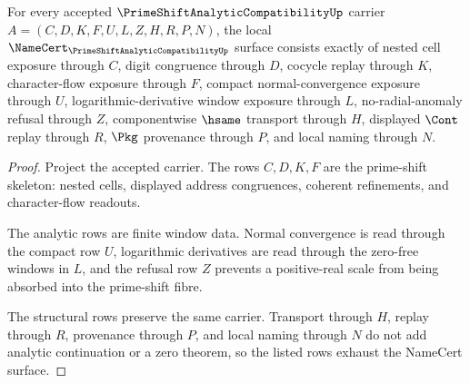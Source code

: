 \begin{theorem}
\label{thm:prime-shift-analytic-compatibility-namecert-obligations}
For every accepted $\PrimeShiftAnalyticCompatibilityUp$ carrier $A=(C,D,K,F,U,L,Z,H,R,P,N)$, the local $\NameCert_{\PrimeShiftAnalyticCompatibilityUp}$ surface consists exactly of nested cell exposure through $C$, digit congruence through $D$, cocycle replay through $K$, character-flow exposure through $F$, compact normal-convergence exposure through $U$, logarithmic-derivative window exposure through $L$, no-radial-anomaly refusal through $Z$, componentwise $\hsame$ transport through $H$, displayed $\Cont$ replay through $R$, $\Pkg$ provenance through $P$, and local naming through $N$.
\end{theorem}
\begin{proof}
Project the accepted carrier. The rows $C,D,K,F$ are the prime-shift skeleton: nested cells, displayed address congruences, coherent refinements, and character-flow readouts.

The analytic rows are finite window data. Normal convergence is read through the compact row $U$, logarithmic derivatives are read through the zero-free windows in $L$, and the refusal row $Z$ prevents a positive-real scale from being absorbed into the prime-shift fibre.

The structural rows preserve the same carrier. Transport through $H$, replay through $R$, provenance through $P$, and local naming through $N$ do not add analytic continuation or a zero theorem, so the listed rows exhaust the NameCert surface.
\end{proof}

